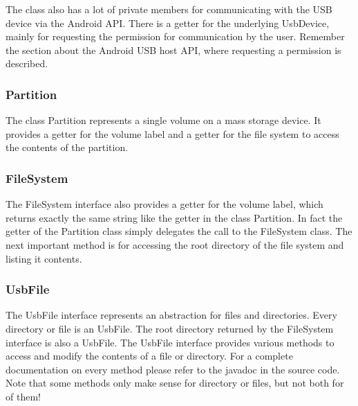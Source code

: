 The class also has a lot of private members for communicating with the USB device via the Android API. There is a getter for the underlying UsbDevice, mainly for requesting the permission for communication by the user. Remember the section about the Android USB host API, where requesting a permission is described.

\subsubsection{Partition}

The class Partition represents a single volume on a mass storage device. It provides a getter for the volume label and a getter for the file system to access the contents of the partition.

\subsubsection{FileSystem}

The FileSystem interface also provides a getter for the volume label, which returns exactly the same string like the getter in the class Partition. In fact the getter of the Partition class simply delegates the call to the FileSystem class. The next important method is for accessing the root directory of the file system and listing it contents.

\subsubsection{UsbFile}

The UsbFile interface represents an abstraction for files and directories. Every directory or file is an UsbFile. The root directory returned by the FileSystem interface is also a UsbFile. The UsbFile interface provides various methods to access and modify the contents of a file or directory. For a complete documentation on every method please refer to the javadoc in the source code. Note that some methods only make sense for directory or files, but not both for of them!

